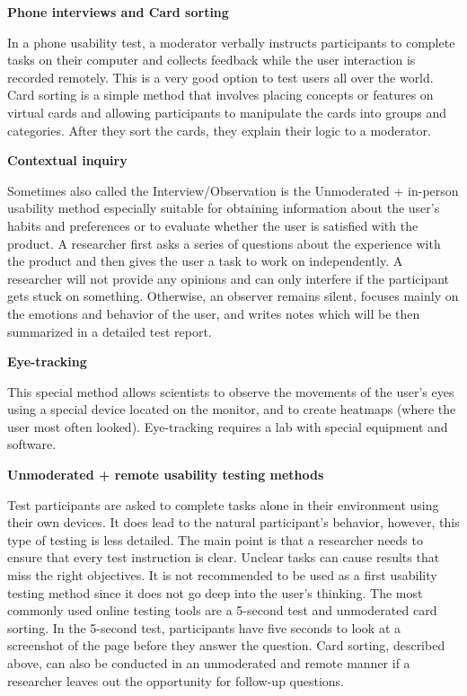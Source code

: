 \documentclass[a4paper,10pt,twoside]{article}
\begin{document}
\noindent \textbf {Phone interviews and Card sorting}

\noindent In a phone usability test, a moderator verbally instructs participants to complete tasks on their computer and collects feedback while the user interaction is recorded remotely. This is a very good option to test users all over the world. Card sorting is a simple method that involves placing concepts or features on virtual cards and allowing participants to manipulate the cards into groups and categories. After they sort the cards, they explain their logic to a moderator.

\smallskip

\noindent \textbf {Contextual inquiry}

\noindent Sometimes also called the Interview/Observation is the Unmoderated + in-person usability method especially suitable for obtaining information about the user's habits and preferences or to evaluate whether the user is satisfied with the product. A researcher first asks a series of questions about the experience with the product and then gives the user a task to work on independently. A researcher will not provide any opinions and can only interfere if the participant gets stuck on something. Otherwise, an observer remains silent, focuses mainly on the emotions and behavior of the user, and writes notes which will be then summarized in a detailed test report.

\smallskip

\noindent \textbf {Eye-tracking}

\noindent This special method allows scientists to observe the movements of the user's eyes using a special device located on the monitor, and to create heatmaps (where the user most often looked). Eye-tracking requires a lab with special equipment and software.

\smallskip

\noindent \textbf {Unmoderated + remote usability testing methods}

\noindent Test participants are asked to complete tasks alone in their environment using their own devices. It does lead to the natural participant's behavior, however, this type of testing is less detailed. The main point is that a researcher needs to ensure that every test instruction is clear. Unclear tasks can cause results that miss the right objectives. It is not recommended to be used as a first usability testing method since it does not go deep into the user’s thinking. The most commonly used online testing tools are a 5-second test and unmoderated card sorting. In the 5-second test, participants have five seconds to look at a screenshot of the page before they answer the question. Card sorting, described above, can also be conducted in an unmoderated and remote manner if a researcher leaves out the opportunity for follow-up questions.
\end{document}
